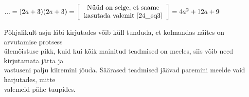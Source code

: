 \begin{center}
{{{\begin{flushleft}
\vspace{5mm}
\hspace{5mm}
$...=(2a+3)(2a+3)=\left[ \begin{tabular}{c}
Nüüd on selge, et saame\\
kasutada valemit \ref{24_eq3}
\end{tabular} \right] = 4a^{2}+12a+9 $

\vspace{2mm}
\hspace{5mm}
Põhjalikult asju läbi kirjutades võib küll tunduda, et kolmandas näites on arvutamise protsess\\ \hspace{5mm} ülemõistuse pikk, kuid kui kõik mainitud teadmised on meeles, siis võib need kirjutamata jätta ja\\ \hspace{5mm} vastuseni palju kiiremini jõuda. Säärased teadmised jäävad paremini meelde vaid harjutades, mitte\\ \hspace{5mm} valemeid pähe tuupides.
\end{flushleft}
}}}
\end{center}

\pagebreak

